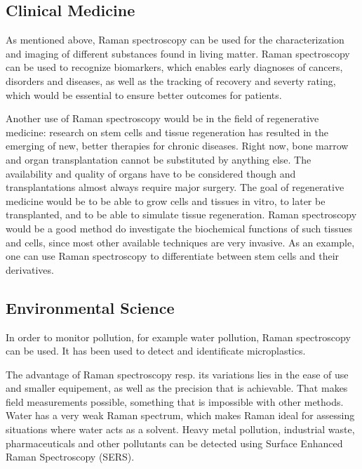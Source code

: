\subsection{Clinical Medicine}
As mentioned above, Raman spectroscopy can be used for the characterization and imaging of different substances found in living matter. Raman spectroscopy can be used to recognize biomarkers, which enables early diagnoses of cancers, disorders and diseases, as well as the tracking of recovery and severty rating, which would be essential to ensure better outcomes for patients. \cite{clinmed}

\bigskip

Another use of Raman spectroscopy would be in the field of regenerative medicine: research on stem cells and tissue regeneration has resulted in the emerging of new, better therapies for chronic diseases. Right now, bone marrow and organ transplantation cannot be substituted by anything else. The availability and quality of organs have to be considered though and transplantations almost always require major surgery. The goal of regenerative medicine would be to be able to grow cells and tissues in vitro, to later be transplanted, and to be able to simulate tissue regeneration. Raman spectroscopy would be a good method do investigate the biochemical functions of such tissues and cells, since most other available techniques are very invasive. As an example, one can use Raman spectroscopy to differentiate between stem cells and their derivatives. \cite{npj}

\subsection{Environmental Science}

In order to monitor pollution, for example water pollution, Raman spectroscopy can be used. It has been used to detect and identificate microplastics.\cite{micropl}

\bigskip

The advantage of Raman spectroscopy resp. its variations lies in the ease of use and smaller equipement, as well as the precision that is achievable. That makes field measurements possible, something that is impossible with other methods. Water has a very weak Raman spectrum, which makes Raman ideal for assessing situations where water acts as a solvent. Heavy metal pollution, industrial waste, pharmaceuticals and other pollutants can be detected using Surface Enhanced Raman Spectroscopy (SERS). \cite{RSAA}